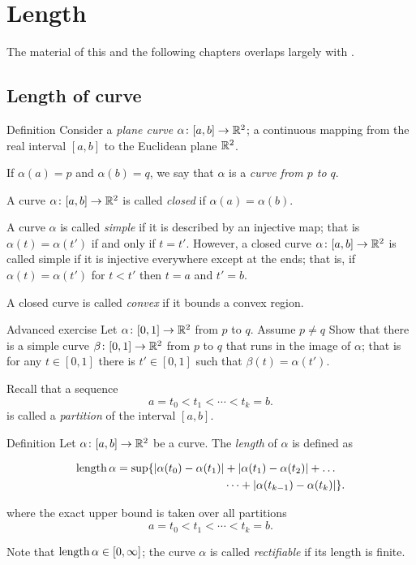\chapter{Length}

The material of this and the following chapters overlaps largely with \cite[Chapter 5]{fuchs-tabachnikov}.

\section{Length of curve}


\begin{thm}{Definition}\label{def:curve}
Consider a \emph{plane curve} $\alpha\:[a,b]\z\to \RR^2$; a continuous mapping from the real interval $[a,b]$ to the Euclidean plane $\mathbb{R}^2$. 


If $\alpha(a)=p$ and $\alpha(b)=q$,
we say that $\alpha$ is a \emph{curve from $p$ to $q$}.

A curve $\alpha\colon[a,b]\to \mathbb{R}^2$ is called \emph{closed} if $\alpha(a)=\alpha(b)$.

A curve $\alpha$ is called \emph{simple} if it is described by an injective map;
that is $\alpha(t)=\alpha(t')$ if and only if $t=t'$.
However, a closed curve $\alpha\colon[a,b]\to \mathbb{R}^2$ is called simple if it is injective 
everywhere except at the ends; that is, if
$\alpha(t)=\alpha(t')$ for $t<t'$ then $t=a$ and $t'=b$.

A closed curve is called \emph{convex} if it bounds a convex region.
\end{thm}

\begin{thm}{Advanced exercise}
Let $\alpha\colon[0,1]\to\mathbb{R}^2$  from $p$ to $q$.
Assume $p\ne q$
Show that there is a simple curve $\beta\colon[0,1]\to\mathbb{R}^2$  from $p$ to $q$
that runs in the image of $\alpha$;
that is for any $t\in [0,1]$ there is $t'\in [0,1]$ such that $\beta(t)=\alpha(t')$.
\end{thm}

 
Recall that a sequence 
\[a=t_0 < t_1 < \cdots < t_k=b.\]
is called a \emph{partition} of the interval $[a,b]$.

\begin{thm}{Definition}\label{def:length}
Let $\alpha\colon[a,b]\to \mathbb{R}^2$ be a curve.
The \emph{length} of $\alpha$ is defined as

\begin{align*}
\mathop{\rm length}\nolimits \alpha
= 
\sup \{|\alpha(t_0)-\alpha(t_1)|&+|\alpha(t_1)-\alpha(t_2)|+\dots
\\
&\dots+|\alpha(t_{k-1})-\alpha(t_k)|\}. 
\end{align*}

where the exact upper bound is taken over all partitions
\[a=t_0 < t_1 < \cdots < t_k=b.\]

Note that $\mathop{\rm length}\nolimits\alpha\in[0,\infty]$;
the curve $\alpha$ is called \emph{rectifiable} if its length is finite.
\end{thm}

